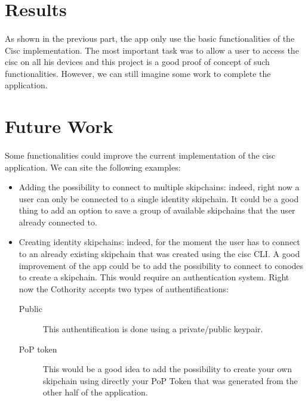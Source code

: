 \section{Results}

\paragraph{}
As shown in the previous part, the app only use the basic functionalities of the Cisc implementation. The most important task was to allow a user to access the cisc on all his devices and this project is a good proof of concept of such functionalities. However, we can still imagine some work to complete the application.

\section{Future Work}

\paragraph{}
Some functionalities could improve the current implementation of the cisc application. We can site the following examples:
\begin{itemize}
  \item Adding the possibility to connect to multiple skipchains: indeed, right now a user can only be connected to a single identity skipchain. It could be a good thing to add an option to save a group of available skipchains that the user already connected to.
  \item Creating identity skipchains: indeed, for the moment the user has to connect to an already existing skipchain that was created using the cisc CLI. A good improvement of the app could be to add the possibility to connect to conodes to create a skipchain. This would require an authentication system. Right now the Cothority accepts two types of authentifications:
  \begin{description}
    \item[Public] This authentification is done using a private/public keypair.
    \item[PoP token] This would be a good idea to add the possibility to create your own skipchain using directly your PoP Token that was generated from the other half of the application.
  \end{description}
\end{itemize}
